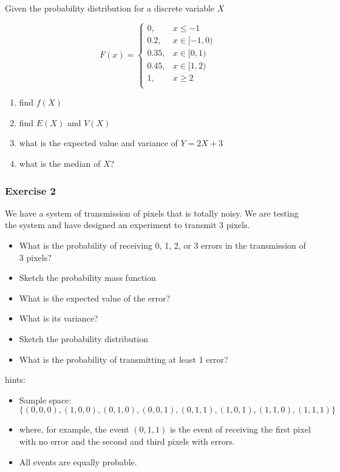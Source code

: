 \documentclass[
]{book}
\providecommand{\tightlist}{%
  \setlength{\itemsep}{0pt}\setlength{\parskip}{0pt}}
\begin{document}
Given the probability distribution for a discrete variable \(X\)

\[
    F(x)= 
\begin{cases}
0, & x \leq -1 \\
0.2,& x \in [-1,0)\\
0.35,& x \in [0,1)\\
0.45,& x \in [1,2)\\
1,& x \geq 2\\
\end{cases}
\]

\begin{enumerate}
\def\labelenumi{\alph{enumi})}
\tightlist
\item
  find \(f(X)\)
\item
  find \(E(X)\) and \(V(X)\)
\item
  what is the expected value and variance of \(Y=2X+3\)
\item
  what is the median of \(X\)?
\end{enumerate}

\hypertarget{exercise-2-3}{%
\subsubsection{Exercise 2}\label{exercise-2-3}}

We have a system of transmission of pixels that is totally noisy. We are testing the system and have designed an experiment to transmit 3 pixels.

\begin{itemize}
\item
  What is the probability of receiving 0, 1, 2, or 3 errors in the transmission of 3 pixels?
\item
  Sketch the probability mass function
\item
  What is the expected value of the error?
\item
  What is its variance?
\item
  Sketch the probability distribution
\item
  What is the probability of transmitting at least 1 error?
\end{itemize}

hints:

\begin{itemize}
\item
  Sample space: \(\{(0,0,0), (1,0,0), (0,1,0), (0,0,1), (0,1,1), (1,0,1), (1,1,0), (1,1,1)\}\)
\item
  where, for example, the event \((0,1,1)\) is the event of receiving the first pixel with no error and the second and third pixels with errors.
\item
  All events are equally probable.
\end{itemize}
\end{document}
